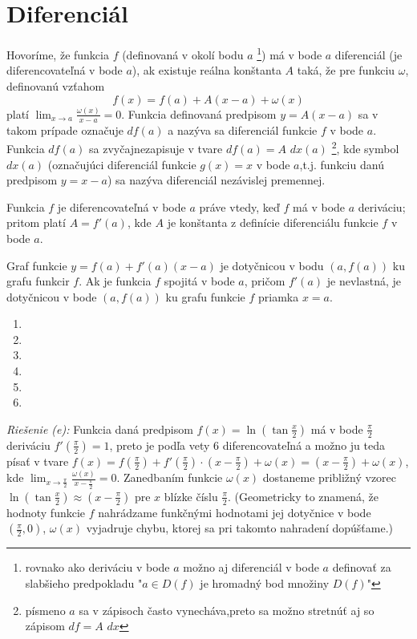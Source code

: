 \section{Diferenciál}
Hovoríme, že funkcia $f$ (definovaná v okolí bodu $a$ \footnote{rovnako ako deriváciu v bode $a$ možno aj diferenciál v bode $a$ definovať za slabšieho predpokladu "$a\in D(f)$ je hromadný bod množiny $D(f)$"}) má v bode $a$ diferenciál (je diferencovateľná v bode $a$), ak existuje reálna konštanta $A$ taká, že pre funkciu $\omega$, definovanú vzťahom
$$f(x)=f(a)+A(x-a)+\omega(x)$$ platí $\lim_{x \rightarrow a}\frac{\omega(x)}{x-a}=0$.
Funkcia definovaná predpisom $y=A(x-a)$ sa v takom prípade označuje $df(a)$ a nazýva sa diferenciál funkcie $f$ v bode $a$. Funkcia $df(a)$ sa zvyčajnezapisuje v tvare $df(a)=A$ $dx(a)$ \footnote{písmeno $a$ sa v zápisoch často vynecháva,preto sa možno stretnúť aj so zápisom $df=A$ $dx$}, kde symbol $dx(a)$ (označujúci diferenciál funkcie $g(x)=x$ v bode $a$,t.j. funkciu danú predpisom $y=x-a$) sa nazýva diferenciál nezávislej premennej.
\begin{veta}
Funkcia $f$ je diferencovateľná v bode $a$ práve vtedy, keď $f$ má v bode $a$ deriváciu; pritom platí $A=f'(a)$, kde $A$ je konštanta z definície diferenciálu funkcie $f$ v bode $a$.
\end{veta}

Graf funkcie $y=f(a)+f'(a)(x-a)$ je dotyčnicou v bodu $(a,f(a))$ ku grafu funkcir $f$. Ak je funkcia $f$ spojitá v bode $a$, pričom $f'(a)$ je nevlastná, je dotyčnicou v bode $(a,f(a))$ ku grafu funkcie $f$ priamka $x=a$.

\begin{enumerate}[resume]
	\item {}
	\item {}
	\item {}
	\item {}
	\item {}
	\item {}
\end{enumerate}

\textit{Riešenie (e):}
Funkcia daná predpisom $f(x)=\ln (\tan \frac{x}{2})$ má v bode $\frac{\pi}{2}$ deriváciu $f'(\frac{\pi}{2})=1$, preto je podľa vety $6$ diferencovateľná a možno ju teda písať v tvare $f(x)=f(\frac{\pi}{2})+f'(\frac{\pi}{2})\cdot (x-\frac{\pi}{2})+\omega(x)=(x-\frac{\pi}{2})+\omega(x)$, kde $\lim_{x \rightarrow \frac{\pi}{2}}\frac{\omega(x)}{x-\frac{\pi}{2}}=0$. Zanedbaním funkcie $\omega(x)$ dostaneme približný vzorec $\ln (\tan \frac{x}{2})\approx (x-\frac{\pi}{2})$ pre $x$ blízke číslu $\frac{\pi}{2}$. (Geometricky to znamená, že hodnoty funkcie $f$ nahrádzame funkčnými hodnotami jej dotyčnice v bode $(\frac{\pi}{2},0)$, $\omega(x)$ vyjadruje chybu, ktorej sa pri takomto nahradení dopúšťame.)

